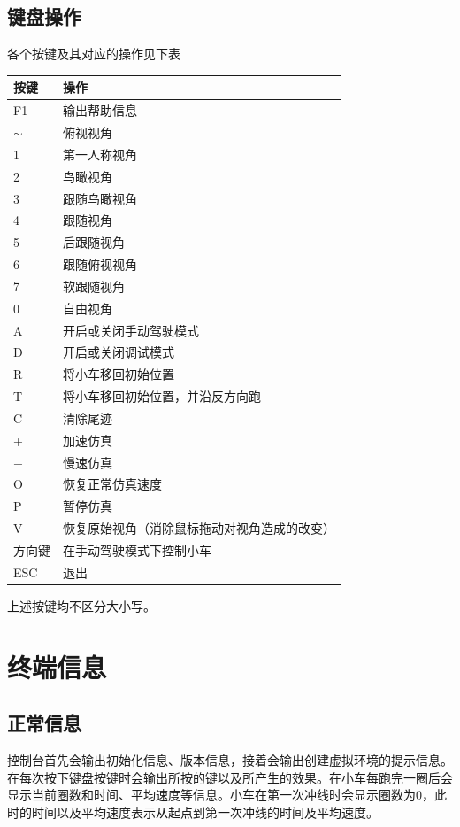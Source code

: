 \documentclass[titlepage,a4paper]{ctexart}
\begin{document}
\subsection{键盘操作}
各个按键及其对应的操作见下表
\begin{center}
\begin{tabular}{ll}
\hline
按键	& 操作 \\
\hline
F1	& 输出帮助信息 \\
$\sim$  & 俯视视角 \\
1	& 第一人称视角 \\
2	& 鸟瞰视角 \\
3	& 跟随鸟瞰视角 \\
4	& 跟随视角 \\
5	& 后跟随视角 \\
6	& 跟随俯视视角 \\
7       & 软跟随视角 \\
0       & 自由视角 \\
A	& 开启或关闭手动驾驶模式 \\
D       & 开启或关闭调试模式 \\
R	& 将小车移回初始位置 \\
T       & 将小车移回初始位置，并沿反方向跑 \\
C	& 清除尾迹 \\
+	& 加速仿真 \\
$-$	& 慢速仿真 \\
O	& 恢复正常仿真速度 \\
P       & 暂停仿真 \\
V	& 恢复原始视角（消除鼠标拖动对视角造成的改变） \\
方向键	& 在手动驾驶模式下控制小车 \\
ESC	& 退出 \\
\hline
\end{tabular}
\end{center}

上述按键均不区分大小写。
\newpage
\section{终端信息}
\subsection{正常信息}
控制台首先会输出初始化信息、版本信息，接着会输出创建虚拟环境的提示信息。在每次按下键盘按键时会输出所按的键以及所产生的效果。在小车每跑完一圈后会显示当前圈数和时间、平均速度等信息。小车在第一次冲线时会显示圈数为0，此时的时间以及平均速度表示从起点到第一次冲线的时间及平均速度。
\end{document}
